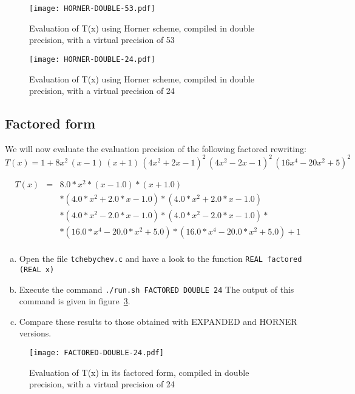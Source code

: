 \begin{figure}[htb]
\center \texttt{[image: HORNER-DOUBLE-53.pdf]}
  \caption{Evaluation of T(x) using Horner scheme, compiled in double precision, with a virtual precision of 53}
  \label{fig:horner:double:53}
\end{figure}
\begin{figure}[htb]
\center \texttt{[image: HORNER-DOUBLE-24.pdf]}
  \caption{Evaluation of T(x) using Horner scheme, compiled in double precision, with a virtual precision of 24}
  \label{fig:horner:double:24}
\end{figure}


\FloatBarrier

\subsection{Factored form}

We will now evaluate the evaluation precision of the following factored rewriting:
\[
	T(x) = 1 + 8x^2\,(x-1)\,(x+1)\,(4x^2 + 2x - 1)^2\, (4x^2 - 2x - 1)^2\,(16x^4 - 20x^2 + 5)^2
\]

\begin{eqnarray*}
T(x) &=& 8.0*x^2*(x - 1.0)*(x + 1.0) \\
 & & * (4.0*x^2 + 2.0*x - 1.0)*(4.0*x^2 + 2.0*x - 1.0) \\
 & & * (4.0*x^2 - 2.0*x - 1.0)*(4.0*x^2 - 2.0*x - 1.0)* \\
 & & * (16.0*x^4 - 20.0*x^2 + 5.0)*(16.0*x^4 - 20.0*x^2 + 5.0) + 1 \\
\end{eqnarray*}

\begin{question}
  \begin{enumerate}[(a)]
  \item Open the file {\tt tchebychev.c} and have a look to the function {\tt REAL factored (REAL x)}
\item Execute the command {\tt ./run.sh FACTORED DOUBLE 24} \newline
The output of this command is given in figure~\ref{fig:factored:double:24}.
\item Compare these results to those obtained with EXPANDED and HORNER versions.
  \end{enumerate}
\end{question}

\begin{figure}[h]
\center \texttt{[image: FACTORED-DOUBLE-24.pdf]}
  \caption{Evaluation of T(x) in its factored form, compiled in double precision, with a virtual precision of 24}
  \label{fig:factored:double:24}
\end{figure}

